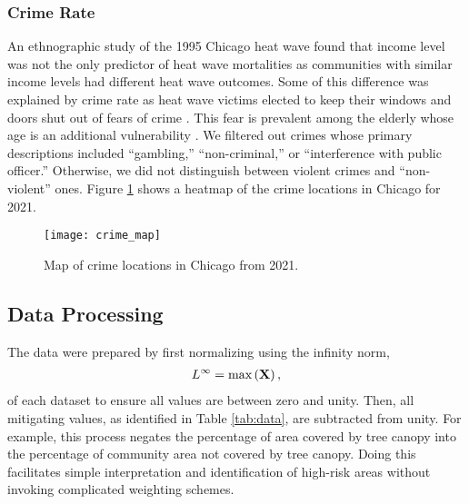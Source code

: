 \subsubsection{Crime Rate}

An ethnographic study of the 1995 Chicago heat wave found that income level was
not the only predictor of heat wave mortalities as communities with similar income
levels had different heat wave outcomes. Some of this difference was explained by
crime rate as heat wave victims elected to keep their windows and doors shut out
of fears of crime \cite{klinenberg_heat_2003}.  This fear is prevalent among
the elderly whose age is an additional vulnerability \cite{gronlund_racial_2014}.
We filtered out crimes whose primary descriptions included ``gambling,''
``non-criminal,'' or ``interference with public officer.'' Otherwise, we did not
distinguish between violent crimes and ``non-violent'' ones.
Figure \ref{fig:crime} shows a heatmap of the crime locations in Chicago for 2021.

\begin{figure}[H]
    \begin{center}
      \texttt{[image: crime\_map]}
      \caption{Map of crime locations in Chicago from 2021.}
      \label{fig:crime}
    \end{center}
\end{figure}

\subsection{Data Processing}
The data were prepared by first normalizing using the infinity norm,
\begin{eqnarray}
  L^{\infty} = \textnormal{max}\left(\mathbf{X}\right),
\end{eqnarray}
of each dataset to ensure all values are between zero and unity. Then, all
mitigating values, as identified in Table \ref{tab:data}, are subtracted from unity.
For example, this process negates the percentage of area covered by tree canopy
into  the percentage of community area not covered by tree canopy. Doing this
facilitates simple interpretation and identification of high-risk areas without
invoking complicated weighting schemes.

